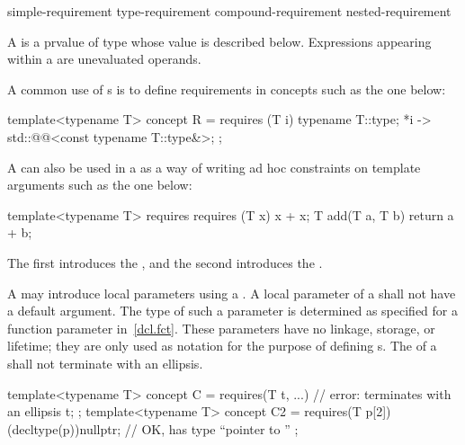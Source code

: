 \begin{bnf}
\br
    simple-requirement\br
    type-requirement\br
    compound-requirement\br
    nested-requirement
\end{bnf}

\pnum
A  is a prvalue of type 
whose value is described below.
Expressions appearing within a 
are unevaluated operands.

\pnum
\begin{example}
A common use of s is to define
requirements in concepts such as the one below:
\begin{codeblock}
template<typename T>
  concept R = requires (T i) {
    typename T::type;
    {*i} -> std::@@<const typename T::type&>;
  };
\end{codeblock}
A  can also be used in a
 as a way of writing ad hoc
constraints on template arguments such as the one below:
\begin{codeblock}
template<typename T>
  requires requires (T x) { x + x; }
    T add(T a, T b) { return a + b; }
\end{codeblock}
The first  introduces the
, and the second
introduces the .
\end{example}

\pnum
A  may introduce local parameters using a
.
A local parameter of a  shall not have a
default argument.
The type of such a parameter is determined as specified for
a function parameter in~\ref{dcl.fct}.
These parameters have no linkage, storage, or lifetime; they are only used
as notation for the purpose of defining s.
The  of a
shall not terminate with an ellipsis.
\begin{example}
\begin{codeblock}
template<typename T>
concept C = requires(T t, ...) {    // error: terminates with an ellipsis
  t;
};
template<typename T>
concept C2 = requires(T p[2]) {
  (decltype(p))nullptr;             // OK,  has type ``pointer to ''
};
\end{codeblock}
\end{example}

